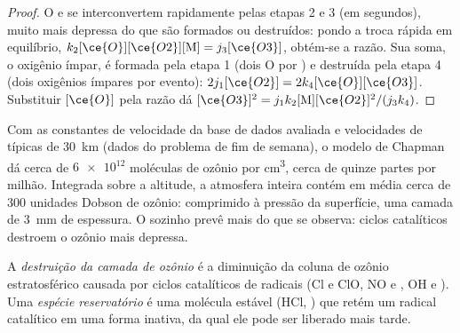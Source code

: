 \begin{proof}
O e  se interconvertem rapidamente pelas etapas 2 e 3 (em segundos), muito mais
depressa do que são formados ou destruídos: pondo a troca rápida em equilíbrio,
$k_2[\ce{O}][\ce{O2}][\mathrm M] = j_3[\ce{O3}]$, obtém-se a razão. Sua soma, o oxigênio ímpar, é formada pela
etapa 1 (dois O por ) e destruída pela etapa 4 (dois oxigênios ímpares por evento):
$2j_1[\ce{O2}] = 2k_4[\ce{O}][\ce{O3}]$. Substituir $[\ce{O}]$ pela razão dá $[\ce{O3}]^2 = j_1k_2[\mathrm M][\ce{O2}]^2/(j_3k_4)$.
\end{proof}

Com as constantes de velocidade da base de dados avaliada e velocidades de
 típicas de \qty{30}{km} (dados do problema de fim de semana), o modelo de
Chapman dá cerca de $\num{6e12}$ moléculas de ozônio por \unit{cm^3}, cerca de quinze partes por
milhão. Integrada sobre a altitude, a atmosfera inteira contém em média cerca de
300 unidades Dobson de ozônio: comprimido à pressão da superfície, uma camada de
\qty{3}{mm} de espessura. O  sozinho prevê mais do que se
observa: ciclos catalíticos destroem o ozônio mais depressa.

\begin{definition}\label{def:b3:photochemistry:ozone-depletion}
A \emph{destruição da camada de ozônio} é a diminuição
da coluna de ozônio estratosférico causada por ciclos catalíticos de radicais (Cl e
ClO, NO e , OH e ). Uma \emph{espécie reservatório}
é uma molécula estável (HCl, ) que retém um radical catalítico em uma forma
inativa, da qual ele pode ser liberado mais tarde.
\end{definition}


